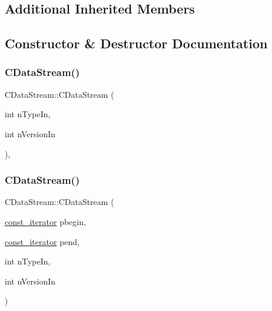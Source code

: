 \subsection*{Additional Inherited Members}


\subsection{Constructor \& Destructor Documentation}
\mbox{\label{class_c_data_stream_a38f4d7d2ae59566a0500523a1b1a49d4}} 
\subsubsection{\texorpdfstring{C\+Data\+Stream()}{CDataStream()}\hspace{0.1cm}{\footnotesize\ttfamily [1/6]}}
{\footnotesize\ttfamily C\+Data\+Stream\+::\+C\+Data\+Stream (\begin{DoxyParamCaption}\item[{int}]{n\+Type\+In,  }\item[{int}]{n\+Version\+In }\end{DoxyParamCaption})\hspace{0.3cm}{\ttfamily [inline]}, {\ttfamily [explicit]}}

\mbox{\label{class_c_data_stream_a00d23d0ef651cb4ea54cb37009bdf8f2}} 
\subsubsection{\texorpdfstring{C\+Data\+Stream()}{CDataStream()}\hspace{0.1cm}{\footnotesize\ttfamily [2/6]}}
{\footnotesize\ttfamily C\+Data\+Stream\+::\+C\+Data\+Stream (\begin{DoxyParamCaption}\item[{\mbox{\hyperlink{class_c_base_data_stream_a9cf3080c5a75c94568980a59d3aab3ad}{const\+\_\+iterator}}}]{pbegin,  }\item[{\mbox{\hyperlink{class_c_base_data_stream_a9cf3080c5a75c94568980a59d3aab3ad}{const\+\_\+iterator}}}]{pend,  }\item[{int}]{n\+Type\+In,  }\item[{int}]{n\+Version\+In }\end{DoxyParamCaption})\hspace{0.3cm}{\ttfamily [inline]}}

